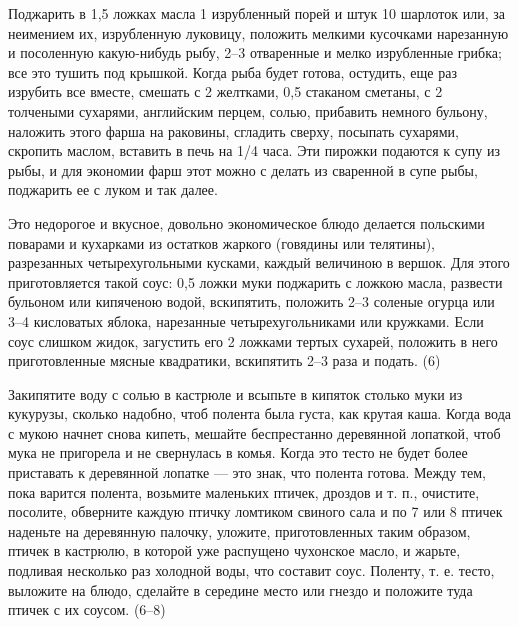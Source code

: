 
Поджарить в 1,5 ложках масла 1 изрубленный порей и штук 10 шарлоток или, за неимением их, изрубленную луковицу, положить мелкими кусочками нарезанную и посоленную какую-нибудь рыбу, 2--3 отваренные и мелко изрубленные грибка; все это тушить под крышкой. Когда рыба будет готова, остудить, еще раз изрубить все вместе, смешать с 2 желтками, 0,5 стаканом сметаны, с 2 толчеными сухарями, английским перцем, солью, прибавить немного бульону, наложить этого фарша на раковины, сгладить сверху, посыпать сухарями, скропить маслом, вставить в печь на 1/4 часа. Эти пирожки подаются к супу из рыбы, и для экономии фарш этот можно с делать из сваренной в супе рыбы, поджарить ее с луком и так далее. 


Это недорогое и вкусное, довольно экономическое блюдо делается польскими поварами и кухарками из остатков жаркого (говядины или телятины), разрезанных четырехугольными кусками, каждый величиною в вершок. Для этого приготовляется такой соус: 0,5 ложки муки поджарить с ложкою масла, развести бульоном или кипяченою водой, вскипятить, положить 2--3 соленые огурца или 3--4 кисловатых яблока, нарезанные четырехугольниками или кружками. Если соус слишком жидок, загустить его 2 ложками тертых сухарей, положить в него приготовленные мясные квадратики, вскипятить 2--3 раза и подать. (6) 


Закипятите воду с солью в кастрюле и всыпьте в кипяток столько муки из кукурузы, сколько надобно, чтоб полента была густа, как крутая каша. Когда вода с мукою начнет снова кипеть, мешайте беспрестанно деревянной лопаткой, чтоб мука не пригорела и не свернулась в комья. Когда это тесто не будет более приставать к деревянной лопатке — это знак, что полента готова. Между тем, пока варится полента, возьмите маленьких птичек, дроздов и т. п., очистите, посолите, обверните каждую птичку ломтиком свиного сала и по 7 или 8 птичек наденьте на деревянную палочку, уложите, приготовленных таким образом, птичек в кастрюлю, в которой уже распущено чухонское масло, и жарьте, подливая несколько раз холодной воды, что составит соус. Поленту, т. е. тесто, выложите на блюдо, сделайте в середине место или гнездо и положите туда птичек с их соусом. (6--8) 


